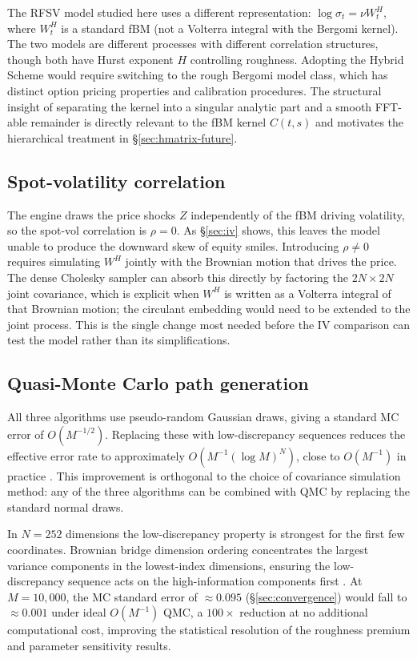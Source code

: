 The RFSV model studied here uses a different representation: $\log\sigma_t =
\nu W_t^H$, where $W_t^H$ is a standard fBM (not a Volterra integral with
the Bergomi kernel).  The two models are different processes with different
correlation structures, though both have Hurst exponent $H$ controlling
roughness.  Adopting the Hybrid Scheme would require switching to the rough
Bergomi model class, which has distinct option pricing properties and
calibration procedures.  The structural insight of separating the kernel into
a singular analytic part and a smooth FFT-able remainder is directly
relevant to the fBM kernel $C(t,s)$ and motivates the hierarchical treatment
in §\ref{sec:hmatrix-future}.

\subsection{Spot-volatility correlation}
\label{sec:rho-future}

The engine draws the price shocks $Z$ independently of the fBM driving
volatility, so the spot-vol correlation is $\rho = 0$.  As §\ref{sec:iv} shows,
this leaves the model unable to produce the downward skew of equity smiles.
Introducing $\rho \neq 0$ requires simulating $W^H$ jointly with the Brownian motion
that drives the price.  The dense Cholesky sampler can absorb this directly by
factoring the $2N \times 2N$ joint covariance, which is explicit when $W^H$ is
written as a Volterra integral of that Brownian motion; the circulant embedding
would need to be extended to the joint process.  This is the single change most
needed before the IV comparison can test the model rather than its
simplifications.

\subsection{Quasi-Monte Carlo path generation}
\label{sec:qmc-future}

All three algorithms use pseudo-random Gaussian draws, giving a standard MC
error of $O(M^{-1/2})$.  Replacing these with low-discrepancy sequences
\citep{niederreiter1992random} reduces the effective error rate to
approximately $O(M^{-1}(\log M)^N)$, close to $O(M^{-1})$ in practice
\citep{glasserman2004monte}.  This improvement is orthogonal to the
choice of covariance simulation method: any of the three algorithms can be
combined with QMC by replacing the standard normal draws.

In $N = 252$ dimensions the low-discrepancy property is strongest for the
first few coordinates.  Brownian bridge dimension ordering concentrates the
largest variance components in the lowest-index dimensions, ensuring the
low-discrepancy sequence acts on the high-information components first
\citep{joy1996quasi}.  At $M = 10{,}000$, the MC standard error of
$\approx 0.095$ (§\ref{sec:convergence}) would fall to $\approx 0.001$ under
ideal $O(M^{-1})$ QMC, a $100\times$ reduction at no additional computational
cost, improving the statistical resolution of the roughness premium and
parameter sensitivity results.
